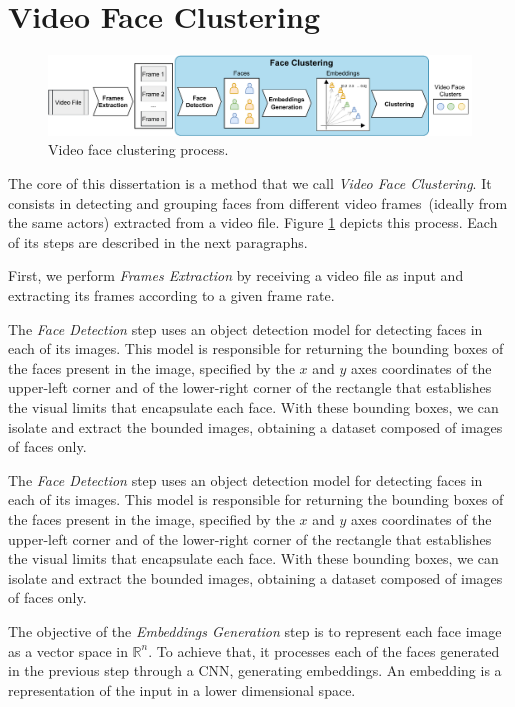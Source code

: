 \section{Video Face Clustering}
\label{sec:video_face_clustering}

\begin{figure}[!ht]
    \centering
    \includegraphics[width=\textwidth]{img/video_face_clustering.pdf}
    \caption{Video face clustering process.}
    \label{fig:video_face_clustering}
\end{figure}

The core of this dissertation is a method that we call \emph{Video Face Clustering}.
It consists in detecting and grouping faces from different video frames~(ideally from the same actors) extracted from a video file.
Figure \ref{fig:video_face_clustering} depicts this process.
Each of its steps are described in the next paragraphs.


First, we perform \textit{Frames Extraction} by receiving a video file as input and extracting its frames according to a given frame rate. 

The \textit{Face Detection} step uses an object detection model for detecting faces in each of its images.
This model is responsible for returning the bounding boxes of the faces present in the image, specified by the $x$ and $y$ axes coordinates of the upper-left corner and of the lower-right corner of the rectangle that establishes the visual limits that encapsulate each face. 
With these bounding boxes, we can isolate and extract the bounded images, obtaining a dataset composed of images of faces only.

The \textit{Face Detection} step uses an object detection model for detecting faces in each of its images.
This model is responsible for returning the bounding boxes of the faces present in the image, specified by the $x$ and $y$ axes coordinates of the upper-left corner and of the lower-right corner of the rectangle that establishes the visual limits that encapsulate each face. 
With these bounding boxes, we can isolate and extract the bounded images, obtaining a dataset composed of images of faces only.


The objective of the \textit{Embeddings Generation} step is to represent each face image as a vector space in $\mathbb{R}^{n}$.
To achieve that, it processes each of the faces generated in the previous step through a CNN, generating embeddings. 
An embedding is a representation of the input in a lower dimensional space.

